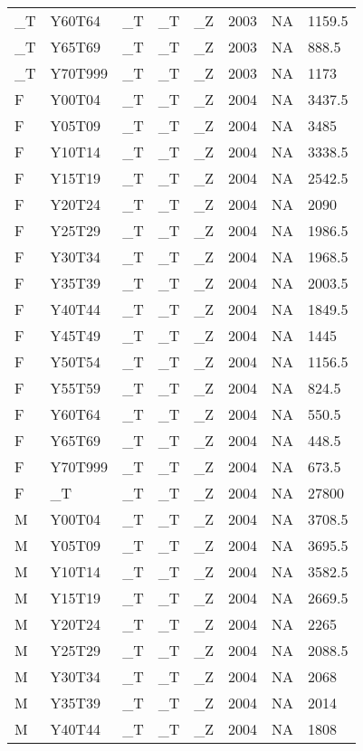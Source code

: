 \begin{longtable}[t]{llllllll}
\_T & Y60T64 & \_T & \_T & \_Z & 2003 & NA & 1159.5\\
\_T & Y65T69 & \_T & \_T & \_Z & 2003 & NA & 888.5\\
\addlinespace
\_T & Y70T999 & \_T & \_T & \_Z & 2003 & NA & 1173\\
F & Y00T04 & \_T & \_T & \_Z & 2004 & NA & 3437.5\\
F & Y05T09 & \_T & \_T & \_Z & 2004 & NA & 3485\\
F & Y10T14 & \_T & \_T & \_Z & 2004 & NA & 3338.5\\
F & Y15T19 & \_T & \_T & \_Z & 2004 & NA & 2542.5\\
\addlinespace
F & Y20T24 & \_T & \_T & \_Z & 2004 & NA & 2090\\
F & Y25T29 & \_T & \_T & \_Z & 2004 & NA & 1986.5\\
F & Y30T34 & \_T & \_T & \_Z & 2004 & NA & 1968.5\\
F & Y35T39 & \_T & \_T & \_Z & 2004 & NA & 2003.5\\
F & Y40T44 & \_T & \_T & \_Z & 2004 & NA & 1849.5\\
\addlinespace
F & Y45T49 & \_T & \_T & \_Z & 2004 & NA & 1445\\
F & Y50T54 & \_T & \_T & \_Z & 2004 & NA & 1156.5\\
F & Y55T59 & \_T & \_T & \_Z & 2004 & NA & 824.5\\
F & Y60T64 & \_T & \_T & \_Z & 2004 & NA & 550.5\\
F & Y65T69 & \_T & \_T & \_Z & 2004 & NA & 448.5\\
\addlinespace
F & Y70T999 & \_T & \_T & \_Z & 2004 & NA & 673.5\\
F & \_T & \_T & \_T & \_Z & 2004 & NA & 27800\\
M & Y00T04 & \_T & \_T & \_Z & 2004 & NA & 3708.5\\
M & Y05T09 & \_T & \_T & \_Z & 2004 & NA & 3695.5\\
M & Y10T14 & \_T & \_T & \_Z & 2004 & NA & 3582.5\\
\addlinespace
M & Y15T19 & \_T & \_T & \_Z & 2004 & NA & 2669.5\\
M & Y20T24 & \_T & \_T & \_Z & 2004 & NA & 2265\\
M & Y25T29 & \_T & \_T & \_Z & 2004 & NA & 2088.5\\
M & Y30T34 & \_T & \_T & \_Z & 2004 & NA & 2068\\
M & Y35T39 & \_T & \_T & \_Z & 2004 & NA & 2014\\
\addlinespace
M & Y40T44 & \_T & \_T & \_Z & 2004 & NA & 1808\\

\end{longtable}
